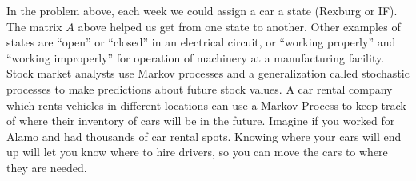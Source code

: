 In the problem above, each week we could assign a car a state (Rexburg or IF).  The matrix $A$ above helped us get from one state to another.  Other examples of states are ``open'' or ``closed'' in an electrical circuit, or ``working properly'' and ``working improperly'' for operation of machinery at a manufacturing facility.  Stock market analysts use Markov processes and a generalization called stochastic processes to make predictions about future stock values. A car rental company which rents vehicles in different locations can use a Markov Process to keep track of where their inventory of cars will be in the future.  Imagine if you worked for Alamo and had thousands of car rental spots. Knowing where your cars will end up will let you know where to hire drivers, so you can move the cars to where they are needed. 









